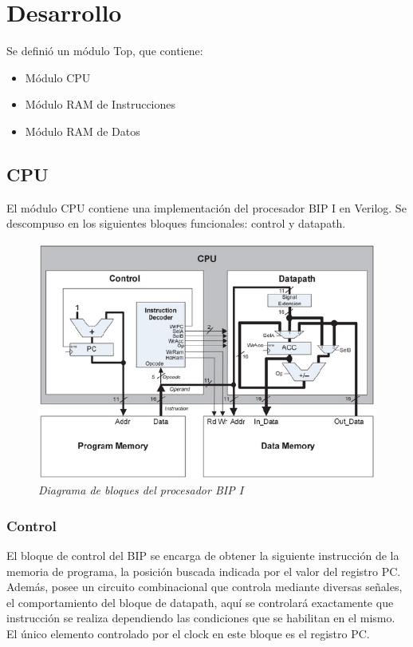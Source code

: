 \documentclass[12pt,A4paper,titlepage]{article}
\begin{document}
\section{Desarrollo}
Se definió un módulo Top, que contiene: 
\begin{itemize}
    \item Módulo CPU
    \item Módulo RAM de Instrucciones
    \item Módulo RAM de Datos
\end{itemize}

\subsection{CPU}
El módulo CPU contiene una implementación del procesador BIP I en Verilog. Se descompuso en los siguientes bloques funcionales: control y datapath.
\begin{figure} [H]
    \centering
    \includegraphics[scale=0.85]{figure/DB-BIP-I.png}
    \caption{\textit{Diagrama de bloques del procesador BIP I}}
    \label{fig:DB-BIP-I}
\end{figure}

\subsubsection{Control}
El bloque de control del BIP se encarga de obtener la siguiente instrucción de la memoria de programa, la posición buscada indicada por el valor del registro PC. Además, posee un circuito combinacional que controla mediante diversas señales, el comportamiento del bloque de datapath, aquí se controlará exactamente que instrucción se realiza dependiendo las condiciones que se habilitan en el mismo. El único elemento controlado por el clock en este bloque es el registro PC.
\end{document}
